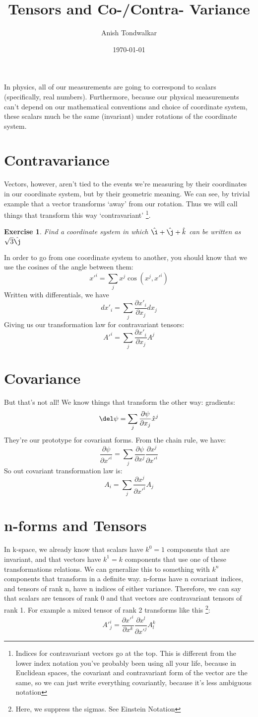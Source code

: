 \documentclass[11pt,notitlepage]{article}
\title{Tensors and Co-/Contra- Variance}
\author{Anish Tondwalkar}
\date{\today}
\newtheorem{exc}{Exercise}[section]
\begin{document}
\maketitle
In physics, all of our measurements are going to correspond to scalars (specifically, real numbers). 
Furthermore, because our physical measurements can't depend on our mathematical conventions and choice of coordinate system,
these scalars much be the same (invariant) under rotations of the coordinate system.
\section{Contravariance}
Vectors, however, aren't tied to the events we're measuring by their coordinates in our coordinate system, but by their geometric meaning.
We can see, by trivial example that a vector transforms `away' from our rotation. 
Thus we will call things that transform this way `contravariant'
\footnote{Indices for contravariant vectors go at the top. This is different from the lower index notation you've probably been using all your life, because in Euclidean spaces, the covariant and contravariant form of the vector are the same, so we can just write everything covariantly, because it's less ambiguous notation}. 
\begin{exc}
Find a coordinate system in which
$\hat\i + \hat\j + \hat k$
 can be written as $\sqrt3 \hat\j$
\end{exc}
In order to go from one coordinate system to another, you should know that we use the cosines of the angle between them:
$$ x'^i = \sum_j x^j \cos(x^j,x'^i) $$
Written with differentials, we have
$$ dx'_i = \sum_j \frac{\partial x'_i}{\partial x_j} dx_j $$
Giving us our transformation law for contravariant tensors:
$$ A'^i = \sum_j \frac{\partial x'_i}{\partial x_j} A^j $$
\section{Covariance}
But that's not all! We know things that transform the other way: gradients:
$$ \del \psi = \sum_j \frac{\partial \psi}{\partial x_j} \hat x^j $$
 They're our prototype for covariant forms. 
From the chain rule, we have: 
$$\frac{\partial \psi}{\partial x'^i} = \sum_j \frac{\partial \psi}{\partial x^j} \frac{\partial x^j}{\partial x'^i} $$
So out covariant transformation law is:
$$ A_i = \sum_j \frac{\partial x^j}{\partial x'^i} A_j$$

\section{n-forms and Tensors}
In k-space, we already know that scalars have $k^0=1$ components that are invariant, and that vectors have $k^1=k$ components that use one of these transformations relations. We can generalize this to something with $k^n$ components that transform in a definite way. n-forms have n covariant indices, and tensors of rank n, have n indices of either variance. Therefore, we can say that scalars are tensors of rank 0 and that vectors are contravariant tensors of rank 1. For example a mixed tensor of rank 2 transforms like this \footnote{Here, we suppress the sigmas. See Einstein Notation}:
$$A'^i_j =  \frac{\partial x'^i}{\partial x^k}\frac{\partial x^l}{\partial x'^j} A^k_l $$
\end{document}
